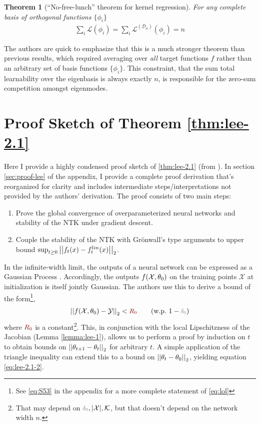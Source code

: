 \documentclass{article}
\newtheorem{theorem}{Theorem}[section]
\newcommand\mc{\mathcal}
\begin{document}
\begin{theorem}[``No-free-lunch'' theorem for kernel regression]\label{thm:lunch}
	For any complete basis of orthogonal functions $\{\phi_i \}$
	\begin{align}
		\sum_{i} \mathcal L(\phi_i) = \sum_{i} \mathcal L^{(\mathcal D_n)}(\phi_i) = n
	\end{align}
\end{theorem}

The authors are quick to emphasize that this is a much stronger theorem than previous results, which required averaging over \textit{all} target functions $f$ rather than an arbitrary set of basis functions $\{\phi_i \}$. This constraint, that the sum total learnability over the eigenbasis is always exactly $n$, is responsible for the zero-sum competition amongst eigenmodes. 

\section{Proof Sketch of Theorem \ref{thm:lee-2.1}} %

Here I provide a highly condensed proof sketch of \ref{thm:lee-2.1} (from \cite{lee2019}). In section \ref{sec:proof-lee} of the appendix, I provide a complete proof derivation that's reorganized for clarity and includes intermediate steps/interpretations not provided by the authors' derivation. The proof consists of two main steps:
\begin{enumerate}
	\item Prove the global convergence of overparameterized neural networks and stability of the NTK under gradient descent. 
	
	\item Couple the stability of the NTK with Gr\"{o}nwall's type arguments to upper bound $\sup_{t \geq 0} \left|\left| f_t(x) - f_t^{lin}(x) \right|\right|_{2}$. 
\end{enumerate}

In the infinite-width limit, the outputs of a neural network can be expressed as a Gaussian Process \cite{neal1996}. Accordingly, the outputs $\f[0]$ on the training points $\mc X$ at initialization is itself jointly Gaussian. The authors use this to derive a bound of the form\footnote{See \ref{eq:S53} in the appendix for a more complete statement of \ref{eq:lol}},
\begin{align}
	\norm{\g[0]} < \r \qquad (\text{w.p.} ~ 1 - \d) \label{eq:lol}
\end{align}
where $\r$ is a constant\footnote{That may depend on $\d, |\mc X|, \mc K$, but that doesn't depend on the network width $n$.}. This, in conjunction with the local Lipschitzness of the Jacobian (Lemma \ref{lemma:lee-1}), allows us to perform a proof by induction on $t$ to obtain bounds on $\left|\left| \theta_{t+1} - \theta_t \right|\right|_{2}$ for arbitrary $t$. A simple application of the triangle inequality can extend this to a bound on $\left|\left| \theta_t - \theta_0 \right|\right|_{2}$, yielding equation \ref{eq:lee-2.1-2}.
\end{document}
